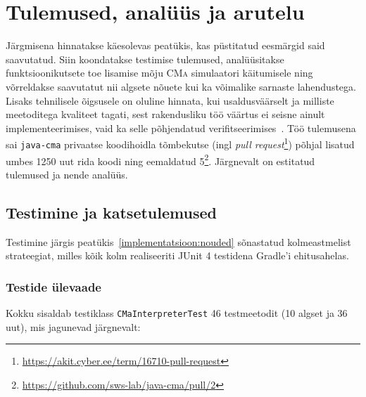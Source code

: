 ﻿\section{Tulemused, analüüs ja arutelu}\label{tulemused}

Järgmisena hinnatakse käesolevas peatükis, kas püstitatud eesmärgid said saavutatud. Siin koondatakse testimise tulemused, analüüsitakse funktsioonikutsete toe lisamise mõju \textsc{CMa} simulaatori käitumisele ning võrreldakse saavutatut nii algsete nõuete kui ka võimalike sarnaste lahendustega. Lisaks tehnilisele õigsusele on oluline hinnata, kui usaldusväärselt ja milliste meetoditega kvaliteet tagati, sest rakendusliku töö väärtus ei seisne ainult implementeerimises, vaid ka selle põhjendatud verifitseerimises~\cite{briand_empirical_2004}. Töö tulemusena sai \texttt{java-cma} privaatse koodihoidla tõmbekutse (ingl \emph{pull request}\footnote{\url{https://akit.cyber.ee/term/16710-pull-request}}) põhjal lisatud umbes 1250 uut rida koodi ning eemaldatud 5\footnote{\url{https://github.com/sws-lab/java-cma/pull/2}}. Järgnevalt on estitatud tulemused ja nende analüüs.

\subsection{Testimine ja katsetulemused}\label{tulemused:testimine}

Testimine järgis peatükis~\ref{implementatsioon:nouded} sõnastatud kolmeastmelist strateegiat, milles kõik kolm realiseeriti JUnit 4 testidena Gradle'i ehitusahelas.

\subsubsection{Testide ülevaade}

Kokku sisaldab testiklass \texttt{CMaInterpreterTest} 46 testmeetodit (10 algset ja 36 uut), mis jagunevad järgnevalt:

